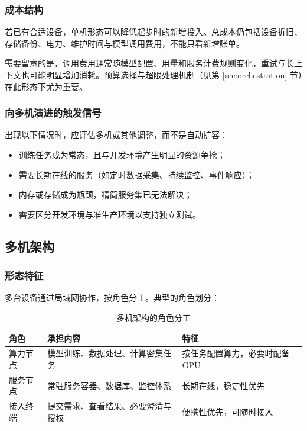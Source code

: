 \documentclass[11pt,a4paper]{article}
\begin{document}
\subsubsection{成本结构}

若已有合适设备，单机形态可以降低起步时的新增投入。总成本仍包括设备折旧、存储备份、电力、维护时间与模型调用费用，不能只看新增账单。

需要留意的是，调用费用通常随模型配置、用量和服务计费规则变化，重试与长上下文也可能明显增加消耗。预算选择与超限处理机制（见第 \ref{sec:orchestration} 节）在此形态下尤为重要。

\subsubsection{向多机演进的触发信号}

出现以下情况时，应评估多机或其他调整，而不是自动扩容：

\begin{itemize}[leftmargin=2em,itemsep=2pt]
  \item 训练任务成为常态，且与开发环境产生明显的资源争抢；
  \item 需要长期在线的服务（如定时数据采集、持续监控、事件响应）；
  \item 内存或存储成为瓶颈，精简服务集已无法解决；
  \item 需要区分开发环境与准生产环境以支持独立测试。
\end{itemize}

\subsection{多机架构}

\subsubsection{形态特征}

多台设备通过局域网协作，按角色分工。典型的角色划分：

\begin{table}[H]
\centering
\renewcommand{\arraystretch}{1.35}
\begin{tabularx}{\textwidth}{P{2.6cm} P{4.2cm} L}
\toprule
\textbf{角色} & \textbf{承担内容} & \textbf{特征} \\
\midrule
算力节点 & 模型训练、数据处理、计算密集任务 & 按任务配置算力，必要时配备 GPU \\
服务节点 & 常驻服务容器、数据库、监控体系 & 长期在线，稳定性优先 \\
接入终端 & 提交需求、查看结果、必要澄清与授权 & 便携性优先，可随时接入 \\
\bottomrule
\end{tabularx}
\caption{多机架构的角色分工}
\end{table}
\end{document}
